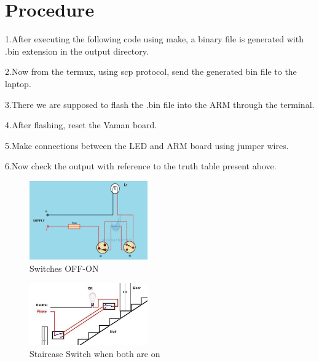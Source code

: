 \documentclass[journal,12pt,twocolumn]{IEEEtran}
\begin{document}
\section{Procedure}
\raggedright 1.After executing the following code using make, a binary file is generated with .bin extension in the output directory. \vspace{2mm} \\ 
\raggedright 2.Now from the termux, using scp protocol, send the generated bin file to the laptop. \\ \vspace{2mm}
\raggedright 3.There we are supposed to flash the .bin file into the ARM through the terminal.\\ \vspace{2mm}
\raggedright 4.After flashing, reset the Vaman board.\\ \vspace{2mm}
\raggedright 5.Make connections between the LED and ARM board using jumper wires. \\ \vspace{2mm}
\raggedright 6.Now check the output with reference to the truth table present above.


\begin{figure}
    \centering
    \includegraphics[width=2in]{xnor.jpeg}
    \caption{Switches OFF-ON}
    \label{fig:circuit}
\end{figure}

\begin{figure}
    \centering
    \includegraphics[width=2in]{Staircase.jpeg}
    \caption{Staircase Switch when both are on}
    \label{fig:circuit}
\end{figure}
\end{document}
